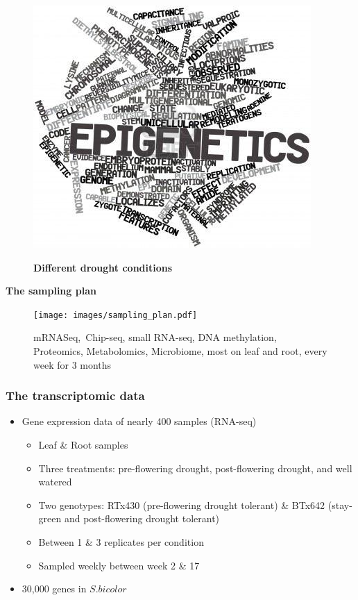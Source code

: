 \documentclass[xcolor=dvipsnames]{beamer}
\begin{document}
\begin{frame}
\begin{figure}
\begin{minipage}{0.5\textwidth}
\begin{center}
\end{center}
\caption{\bf Different drought conditions}
\end{minipage}
\begin{minipage}{0.3\textwidth}
\includegraphics[width=0.8\linewidth]{images/epigenetics.png}\\
\end{minipage}
\end{figure}

\textbf{\color{Blue} The sampling plan}\\
\begin{figure}
\vspace{-3em}
\texttt{[image: images/sampling\_plan.pdf]}
\caption{mRNASeq, Chip-seq, small RNA-seq, DNA methylation, Proteomics,
Metabolomics, Microbiome, most on leaf and root, every week for 3 months}
\end{figure}
\end{frame}  



\begin{frame}
\frametitle{The transcriptomic data}
\begin{itemize}[label={$\bullet$}]
\item Gene expression data of nearly 400 samples (RNA-seq)
\begin{itemize}[label={$\bullet$}]
\item Leaf \& Root samples
\item Three treatments: pre-flowering drought, post-flowering drought, and
well watered
\item Two genotypes: RTx430 (pre-flowering drought tolerant) \& BTx642
(stay-green and post-flowering drought tolerant)
\item Between 1 \& 3 replicates per condition
\item Sampled weekly between week 2 \& 17 
\end{itemize}
\item 30,000 genes in $S. bicolor$
\end{itemize}
\end{frame}
\end{document}
